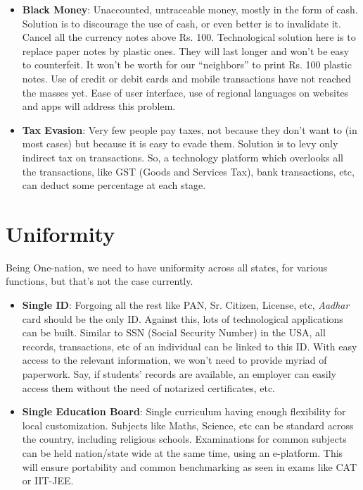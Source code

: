 \documentclass[12pt]{article}
\begin{document}
\begin{itemize}
\item \textbf{Black Money}: Unaccounted, untraceable money, mostly in the form of cash. Solution is to discourage the use of cash, or even better is to invalidate it. Cancel all the currency notes above Rs. 100.  Technological solution here is to replace paper notes by plastic ones. They will last longer and won't be easy to counterfeit. It won't be worth for our ``neighbors'' to print Rs. 100 plastic notes.  Use of credit or debit cards and mobile transactions have not reached the masses yet. Ease of user interface, use of regional languages on websites and apps will address this problem.
\item \textbf{Tax Evasion}: Very few people pay taxes, not because they don't want to (in most cases) but because it is easy to evade them. Solution is to levy only indirect tax on transactions. So, a technology platform which overlooks all the transactions, like GST (Goods and Services Tax),  bank transactions, etc, can deduct some percentage at each stage.
\end{itemize}

\section*{Uniformity}
Being  One-nation, we need to have uniformity across all states, for various functions, but that's not the case currently. 

\begin{itemize}
\item \textbf{Single ID}: Forgoing all the rest like PAN, Sr. Citizen, License, etc, {\em Aadhar} card should be the only ID. Against this, lots of technological applications can be built. Similar to SSN (Social Security Number) in the USA, all records, transactions, etc of an individual can be linked to this ID. With easy access to the relevant information, we won't need to provide myriad of paperwork. Say, if students' records are available, an employer can easily access them without the need of notarized certificates, etc.

\item \textbf{Single Education Board}: Single curriculum having enough flexibility for local customization. Subjects like Maths, Science, etc can be standard across the country, including religious schools. Examinations for common subjects can be held nation/state wide at the same time, using an e-platform.  This will ensure portability and common benchmarking as seen in exams like CAT or IIT-JEE.
\end{itemize}
\end{document}
